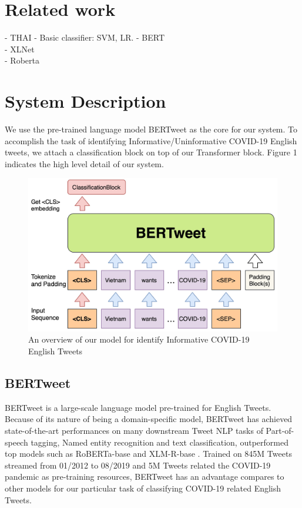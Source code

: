 \documentclass[11pt,a4paper]{article}
\begin{document}
\section{Related work}
- THAI
- Basic classifier: SVM, LR. 
- BERT \\
- XLNet \\
- Roberta \\


\section{System Description}

We use the pre-trained language model BERTweet as the core for our system. To accomplish the task of identifying Informative/Uninformative COVID-19 English tweets, we attach a classification block on top of our Transformer block. Figure 1 indicates the high level detail of our system.

\begin{figure}
    \centering
    \includegraphics[width=\columnwidth]{Model.jpg}
    \caption{An overview of our model for identify Informative COVID-19 English Tweets}
    \label{fig:model}
\end{figure}

\subsection{BERTweet}
BERTweet \cite{BERTweet} is a large-scale language model pre-trained for English Tweets. Because of its nature of being a domain-specific model, BERTweet has achieved state-of-the-art performances on many downstream Tweet NLP tasks of Part-of-speech tagging, Named entity recognition and text classification, outperformed top models such as RoBERTa-base \cite{1907.11692} and XLM-R-base \cite{1911.02116}. Trained on 845M Tweets streamed from 01/2012 to 08/2019 and 5M Tweets related the COVID-19 pandemic as pre-training resources, BERTweet has an advantage compares to other models for our particular task of classifying COVID-19 related English Tweets.
\end{document}
